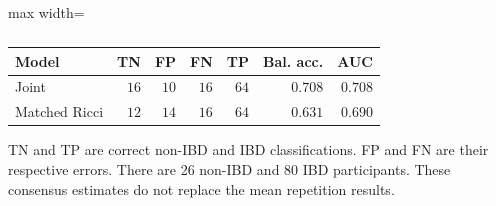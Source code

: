 \begin{table}[!htbp]
\centering\small
\caption{}
\label{tab:joint-v8-consensus}
\begingroup\bfseries\boldmath
\begin{adjustbox}{max width=\linewidth}
\begin{tabular}{lrrrrrr}
\toprule
Model & TN & FP & FN & TP & Bal. acc. & AUC \\
\midrule
Joint & $16$ & $10$ & $16$ & $64$ & $0.708$ & $0.708$ \\
Matched Ricci & $12$ & $14$ & $16$ & $64$ & $0.631$ & $0.690$ \\
\bottomrule
\end{tabular}
\end{adjustbox}
\par\smallskip\begin{minipage}{0.98\linewidth}\footnotesize TN and TP are correct non-IBD and IBD classifications. FP and FN are their respective errors. There are 26 non-IBD and 80 IBD participants. These consensus estimates do not replace the mean repetition results.
\end{minipage}
\endgroup
\end{table}
